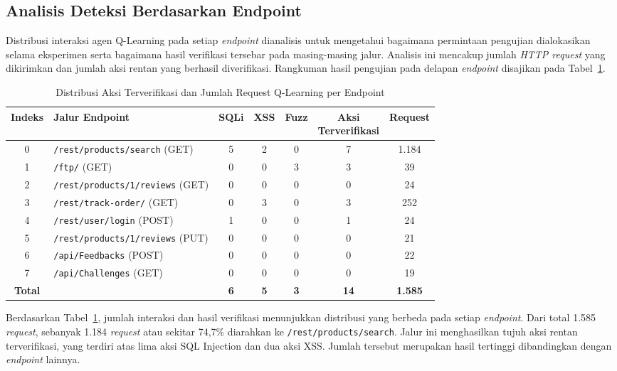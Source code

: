 \begin{enumerate}
\subsection{Analisis Deteksi Berdasarkan Endpoint}

Distribusi interaksi agen Q-Learning pada setiap \textit{endpoint} dianalisis untuk mengetahui bagaimana permintaan pengujian dialokasikan selama eksperimen serta bagaimana hasil verifikasi tersebar pada masing-masing jalur. Analisis ini mencakup jumlah \textit{HTTP request} yang dikirimkan dan jumlah aksi rentan yang berhasil diverifikasi. Rangkuman hasil pengujian pada delapan \textit{endpoint} disajikan pada Tabel~\ref{tab:ql_per_endpoint}.

\begin{table}[!htbp]
\centering
\caption{Distribusi Aksi Terverifikasi dan Jumlah Request Q-Learning per Endpoint}
\label{tab:ql_per_endpoint}
\small
\setlength{\tabcolsep}{3.5pt}
\renewcommand{\arraystretch}{1.15}
\begin{tabular}{c p{4.5cm} c c c c c}
\toprule
\textbf{Indeks} &
\textbf{Jalur Endpoint} &
\textbf{SQLi} &
\textbf{XSS} &
\textbf{Fuzz} &
\shortstack{\textbf{Aksi}\\\textbf{Terverifikasi}} &
\textbf{Request} \\
\midrule
0 & \texttt{/rest/products/search} (GET) & 5 & 2 & 0 & 7 & 1.184 \\
1 & \texttt{/ftp/} (GET) & 0 & 0 & 3 & 3 & 39 \\
2 & \texttt{/rest/products/1/reviews} (GET) & 0 & 0 & 0 & 0 & 24 \\
3 & \texttt{/rest/track-order/} (GET) & 0 & 3 & 0 & 3 & 252 \\
4 & \texttt{/rest/user/login} (POST) & 1 & 0 & 0 & 1 & 24 \\
5 & \texttt{/rest/products/1/reviews} (PUT) & 0 & 0 & 0 & 0 & 21 \\
6 & \texttt{/api/Feedbacks} (POST) & 0 & 0 & 0 & 0 & 22 \\
7 & \texttt{/api/Challenges} (GET) & 0 & 0 & 0 & 0 & 19 \\
\midrule
\textbf{Total} & & \textbf{6} & \textbf{5} & \textbf{3} & \textbf{14} & \textbf{1.585} \\
\bottomrule
\end{tabular}
\end{table}

Berdasarkan Tabel~\ref{tab:ql_per_endpoint}, jumlah interaksi dan hasil verifikasi menunjukkan distribusi yang berbeda pada setiap \textit{endpoint}. Dari total 1.585 \textit{request}, sebanyak 1.184 \textit{request} atau sekitar 74,7\% diarahkan ke \texttt{/rest/products/search}. Jalur ini menghasilkan tujuh aksi rentan terverifikasi, yang terdiri atas lima aksi SQL Injection dan dua aksi XSS. Jumlah tersebut merupakan hasil tertinggi dibandingkan dengan \textit{endpoint} lainnya.


\end{enumerate}
